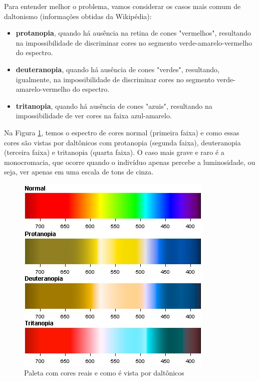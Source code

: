 \documentclass[12pt]{article}   %
\begin{document}
    	\par Para entender melhor o problema, vamos considerar os casos mais comum de daltonismo (informações obtidas da Wikipédia):
    	
    		\begin{itemize}
    			\item \textbf{protanopia}, quando há ausência na retina de cones 	"vermelhos", resultando na impossibilidade de discriminar cores no segmento verde-amarelo-vermelho do espectro.
    			\item \textbf{deuteranopia}, quando há ausência de cones "verdes", resultando, igualmente, na impossibilidade de discriminar cores no segmento verde-amarelo-vermelho do espectro.
    			\item \textbf{tritanopia}, quando há ausência de cones "azuis", resultando na impossibilidade de ver cores na faixa azul-amarelo.
    		\end{itemize}
    
    	\par Na Figura \ref{fig:paleta}, temos o espectro de cores normal (primeira faixa) e como essas cores são vistas por daltônicos com protanopia (segunda faixa), deuteranopia (terceira faixa) e tritanopia (quarta faixa). O caso mais grave e raro é a monocromacia, que ocorre quando o indivíduo apenas percebe a luminosidade, ou seja, ver apenas em uma escala de tons de cinza.
    	
    		\begin{figure}[h!]
    			\centering
    			\caption{Paleta com cores reais e como é vista por daltônicos}
    			\label{fig:paleta}
    			\vspace{+12pt}
    			\includegraphics[scale=1.5]{paleta}
    		\end{figure}
    	\vspace{+16pt}
    	
\end{document}
